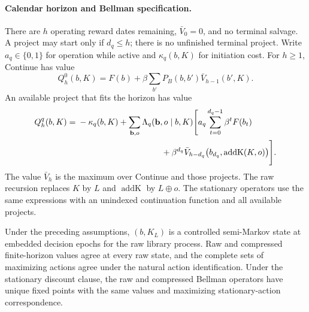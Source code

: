 \paragraph{Calendar horizon and Bellman specification.}
There are $h$ operating reward dates remaining, $\bar V_0=0$, and no terminal
salvage. A project may start only if $d_q\leq h$; there is no unfinished
terminal project. Write $a_q\in\{0,1\}$ for operation while active and
$\kappa_q(b,K)$ for initiation cost. For $h\geq1$, Continue has value
\[
 Q_h^0(b,K)=F(b)+\beta\sum_{b'}P_B(b,b')\bar V_{h-1}(b',K).
\]
An available project that fits the horizon has value
\begin{align}
 Q_h^q(b,K)={}&-\kappa_q(b,K)
 +\sum_{\mathbf b,o}\Lambda_q(\mathbf b,o\mid b,K)
 \Biggl[a_q\sum_{t=0}^{d_q-1}\beta^t F(b_t)\nonumber\\
 &\hspace{35mm}+\beta^{d_q}
 \bar V_{h-d_q}\bigl(b_{d_q},\operatorname{addK}(K,o)\bigr)\Biggr].
 \label{eq:or-calendar-bellman}
\end{align}
The value $\bar V_h$ is the maximum over Continue and those projects. The raw
recursion replaces $K$ by $L$ and $\operatorname{addK}$ by $L\oplus o$.
The stationary operators use the same expressions with an unindexed
continuation function and all available projects.

\begin{theorem}
\label{thm:or-raw-compressed-projection}
Under the preceding assumptions, $(b,K_L)$ is a controlled semi-Markov
state at embedded decision epochs for the raw library process. Raw and compressed
finite-horizon values agree at every raw state, and the complete sets of
maximizing actions agree under the natural action identification. Under the
stationary discount clause, the raw and compressed Bellman operators have
unique fixed points with the same values and maximizing stationary-action
correspondence.
\end{theorem}

